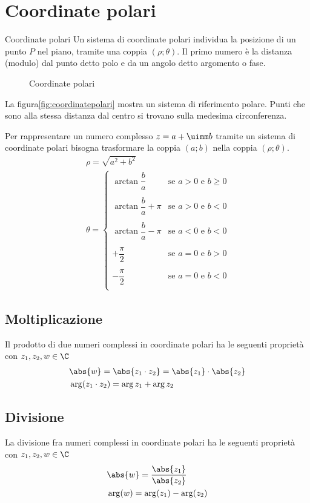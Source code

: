 \section{Coordinate polari}
\begin{definizionet}{Coordinate polari}{}
Un sistema di coordinate polari individua la posizione di un punto $P$ nel piano, tramite una coppia $(\rho;\theta)$.  Il primo numero è la distanza (modulo) dal punto detto polo e da un angolo detto argomento o fase.
\end{definizionet}
\begin{figure} %
	\centering

	\caption{Coordinate polari}
	\label{fig:coordinatepolari}
\end{figure}
La figura\nobs\vref{fig:coordinatepolari} mostra un sistema di riferimento polare. Punti che sono alla stessa distanza dal centro si trovano sulla medesima circonferenza. 

Per rappresentare un numero complesso $z=a+\uimm b$ tramite un sistema di coordinate polari bisogna trasformare la coppia $(a;b)$
nella coppia $(\rho;\theta)$.
\begin{align*}
&\rho=\sqrt{a^2+b^2}\\
&\theta=\begin{cases}
\arctan{\dfrac{b}{a}}&\text{se $a>0$ e $b\geq 0$ }\\
&\\
\arctan{\dfrac{b}{a}}+\pi&\text{se $a>0$ e $b< 0$ }\\
&\\
\arctan{\dfrac{b}{a}}-\pi&\text{se $a<0$ e $b< 0$ }\\
&\\
+\dfrac{\pi}{2}&\text{se $a=0$ e $b> 0$ }\\
&\\
-\dfrac{\pi}{2}&\text{se $a=0$ e $b< 0$ }\\
\end{cases}
\end{align*} 
\subsection{Moltiplicazione}
Il prodotto di due numeri complessi in coordinate polari ha le seguenti proprietà  con $z_1,z_2,w\in \C$ 
\begin{align*}
&\abs{w}=\abs{z_1\cdot z_2}=\abs{z_1}\cdot\abs{z_2}\\
&\arg(z_1\cdot z_2)=\arg{z_1}+\arg{z_2}
\end{align*} 
\subsection{Divisione}
La divisione fra numeri complessi in coordinate polari ha le seguenti proprietà con $z_1,z_2,w\in \C$ 
\begin{align*}
&\abs{w}=\dfrac{\abs{z_1}}{\abs{z_2}}\\
&\arg(w)=\arg (z_1)-\arg (z_2)
\end{align*}
